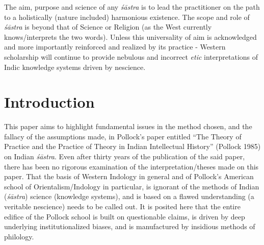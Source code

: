 The aim, purpose and science of any {\sl śāstra} is to lead the practitioner on the path to a holistically (nature included) harmonious existence. The scope and role of {\sl śāstra} is beyond that of Science or Religion (as the West currently knows/interprets the two words). Unless this universality of aim is acknowledged and more importantly reinforced and realized by its practice - Western scholarship will continue to provide nebulous and incorrect {\sl etic} interpretations of Indic knowledge systems driven by nescience.

\section*{Introduction}

This paper aims to highlight fundamental issues in the method chosen, and the fallacy of the assumptions made, in Pollock's paper entitled ``The Theory of Practice and the Practice of Theory in Indian Intellectual History'' (Pollock 1985) on Indian {\sl śāstra}. Even after thirty years of the publication of the said paper, there has been no rigorous examination of the interpretation/theses made on this paper. That the basis of Western Indology in general and of Pollock's American school of Orientalism/Indology in particular, is ignorant of the methods of Indian ({\sl śāstra}) science (knowledge systems), and is based on a flawed understanding (a veritable nescience) needs to be called out. It is posited here that the entire edifice of the Pollock school is built on questionable claims, is driven by deep underlying institutionalized biases, and is manufactured by insidious methods of philology. 

